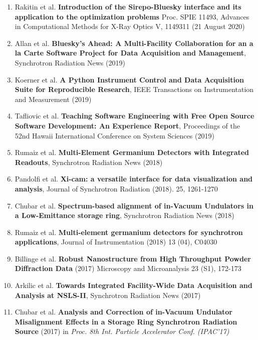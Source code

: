 \documentclass[12pt]{article}
\numberwithin{page}{section}
\begin{document}
\begin{enumerate}[noitemsep]
    \item Rakitin et al. \textbf{Introduction of the Sirepo-Bluesky
    interface and its application to the optimization problems}
    Proc. SPIE 11493, Advances in Computational Methods for X-Ray
    Optics V, 1149311 (21 August 2020)
  \item Allan et al. \textbf{Bluesky's Ahead: A Multi-Facility
    Collaboration for an a la Carte Software Project for Data
    Acquisition and Management}, Synchrotron Radiation News (2019)

  \item Koerner et al. \textbf{A Python Instrument Control and Data
    Acquisition Suite for Reproducible Research}, IEEE Transactions on
    Instrumentation and Measurement (2019)

  \item Tafliovic et al. \textbf{Teaching Software Engineering with
    Free Open Source Software Development: An Experience Report},
    Proceedings of the 52nd Hawaii International Conference on System
    Sciences (2019)

  \item Rumaiz et al. \textbf{Multi-Element Germanium Detectors with
    Integrated Readouts}, Synchrotron Radiation News (2018)

  \item Pandolfi et al. \textbf{Xi-cam: a versatile interface for data
    visualization and analysis}, Journal of Synchrotron Radiation
    (2018). 25, 1261-1270

  \item Chubar et al. \textbf{Spectrum-based alignment of in-Vacuum
    Undulators in a Low-Emittance storage ring}, Synchrotron Radiation
    News (2018)


  \item Rumaiz et al. \textbf{Multi-element germanium detectors for
    synchrotron applications}, Journal of Instrumentation (2018) 13
    (04), C04030

  \item Billinge et al. \textbf{Robust Nanostructure from High
    Throughput Powder Diffraction Data} (2017) Microscopy and
    Microanalysis 23 (S1), 172-173

  \item Arkilic et al. \textbf{Towards Integrated Facility-Wide Data
    Acquisition and Analysis at NSLS-II}, Synchrotron Radiation
    News (2017)

  \item Chubar et al. \textbf{Analysis and Correction of in-Vacuum
    Undulator Misalignment Effects in a Storage Ring Synchrotron
    Radiation Source} (2017) in \emph{Proc. 8th Int. Particle
    Accelerator Conf. (IPAC'17)}


\end{enumerate}
\end{document}
